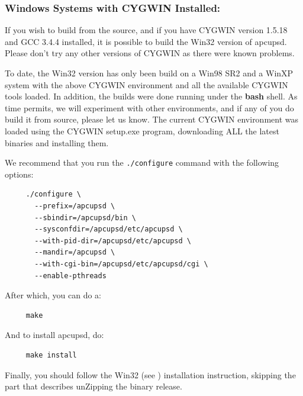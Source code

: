 \label{Windows-Systems-with-CYGWIN-Installed}

\subsubsection*{Windows Systems with CYGWIN Installed:}

\label{index-Windows-55}
\label{index-OS_002c-Windows-56}
If you wish to build from the source, and if you have CYGWIN version 1.5.18 and
GCC 3.4.4 installed, it is possible to build the Win32 version of apcupsd.
Please don't try any other versions of CYGWIN as there were known problems.  

To date, the Win32 version has only been build on a Win98 SR2 and a WinXP
system with the above CYGWIN environment and all the available CYGWIN tools
loaded. In addition, the builds were done running under the {\bf bash} shell.
As time permits, we will experiment with other environments, and if any of you
do build it from source, please let us know. The current CYGWIN environment
was loaded using the CYGWIN setup.exe program, downloading ALL the latest
binaries and installing them.  

We recommend that you run the {\tt ./configure} command with the following
options: 

\footnotesize
\begin{verbatim}
     ./configure \
       --prefix=/apcupsd \
       --sbindir=/apcupsd/bin \
       --sysconfdir=/apcupsd/etc/apcupsd \
       --with-pid-dir=/apcupsd/etc/apcupsd \
       --mandir=/apcupsd \
       --with-cgi-bin=/apcupsd/etc/apcupsd/cgi \
       --enable-pthreads
\end{verbatim}
\normalsize

After which, you can do a: 

\footnotesize
\begin{verbatim}
     make
\end{verbatim}
\normalsize

And to install apcupsd, do: 

\footnotesize
\begin{verbatim}
     make install
\end{verbatim}
\normalsize

Finally, you should follow the Win32 (see 
)
installation instruction, skipping the part that describes unZipping the
binary release. 

\label{After-Installation}

